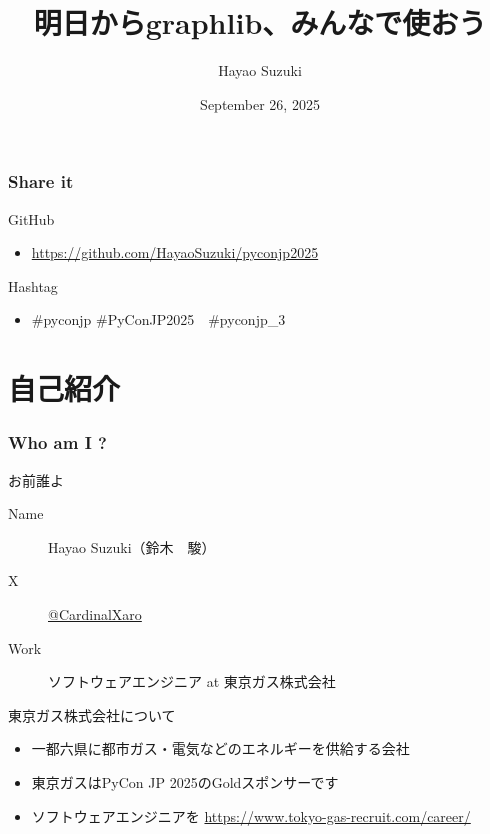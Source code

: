 \documentclass[aspectratio=169,dvipdfmx,12pt,notheorems]{beamer}
\title{明日からgraphlib、みんなで使おう}
\author[Hayao]{Hayao Suzuki}
\institute[PyCon JP 2025]{PyCon JP 2025 at International Conference Center Hiroshima}
\date{September 26, 2025}
\theoremstyle{definition}
\begin{document}
\begin{frame}[plain]\frametitle{}
\titlepage %
\end{frame}

\begin{frame}\frametitle{Share it}

\begin{block}{GitHub}
\begin{itemize}
\item \url{https://github.com/HayaoSuzuki/pyconjp2025}
\end{itemize}
\end{block}

\begin{block}{Hashtag}
\begin{itemize}
\item \#pyconjp \#PyConJP2025　\#pyconjp\_3
\end{itemize}
\end{block}

\end{frame}

\section{自己紹介}

\begin{frame}\frametitle{Who am I ?}

\begin{block}{お前誰よ}
\begin{description}
\item[Name] Hayao Suzuki（鈴木　駿）
\item[ X] \href{https://twitter.com/CardinalXaro}{@CardinalXaro}
\item[Work] ソフトウェアエンジニア at 東京ガス株式会社
\end{description}
\end{block}

\begin{block}{東京ガス株式会社について}
\begin{itemize}
\item 一都六県に都市ガス・電気などのエネルギーを供給する会社
\item 東京ガスはPyCon JP 2025のGoldスポンサーです
\item ソフトウェアエンジニアを \url{https://www.tokyo-gas-recruit.com/career/}
\end{itemize}
\end{block}

\end{frame}
\end{document}
